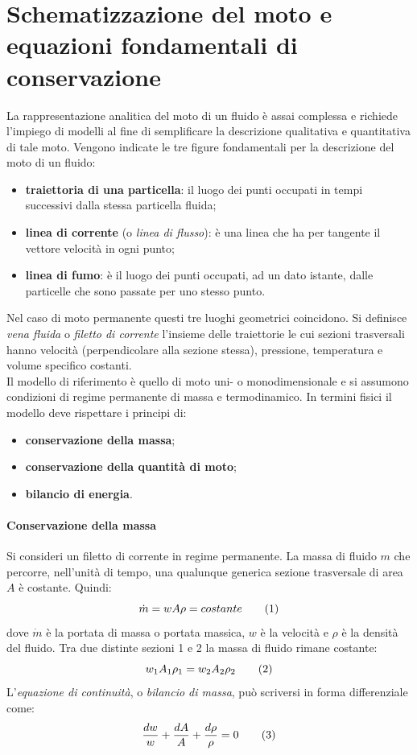 \section[Moto e equazioni fondamentali]{Schematizzazione del moto e equazioni fondamentali di conservazione}
La rappresentazione analitica del moto di un fluido è assai complessa e richiede l'impiego di modelli al fine di semplificare la descrizione qualitativa e quantitativa di tale moto. Vengono indicate le tre figure fondamentali per la descrizione del moto di un fluido:
\begin{itemize}
\item \textbf{traiettoria di una particella}: il luogo dei punti occupati in tempi successivi dalla stessa particella fluida;
\item \textbf{linea di corrente} (o \textit{linea di flusso}): è una linea che ha per tangente il vettore velocità in ogni punto;
\item \textbf{linea di fumo}: è il luogo dei punti occupati, ad un dato istante, dalle particelle che sono passate per uno stesso punto.
\end{itemize}
Nel caso di moto permanente questi  tre luoghi geometrici coincidono. Si definisce \textit{vena fluida} o \textit{filetto di corrente} l'insieme delle traiettorie le cui sezioni trasversali hanno velocità (perpendicolare alla sezione stessa), pressione, temperatura e volume specifico costanti.\\
Il modello di riferimento è quello di moto uni- o monodimensionale e si assumono condizioni di regime permanente di massa e termodinamico. In termini fisici il modello deve rispettare i principi di:
\begin{itemize}
\item \textbf{conservazione della massa};
\item \textbf{conservazione della quantità di moto};
\item \textbf{bilancio di energia}.
\end{itemize}

\paragraph{Conservazione della massa}
Si consideri un filetto di corrente in regime permanente. La massa di fluido $m$ che percorre, nell'unità di tempo, una qualunque generica sezione trasversale di area $A$ è costante. Quindi:
\[\dot{m}=wA\rho = costante\addtag\]
dove $\dot{m}$ è la portata di massa o portata massica, $w$ è la velocità e $\rho$ è la densità del fluido. Tra due distinte sezioni 1 e 2 la massa di fluido rimane costante:
\[w_1 A_1 \rho_1 = w_2 A_2 \rho_2\addtag\]
L'\textit{equazione di continuità}, o \textit{bilancio di massa}, può scriversi in forma differenziale come:
\[\frac{dw}{w} + \frac{dA}{A} + \frac{d\rho}{\rho} = 0\addtag\]

